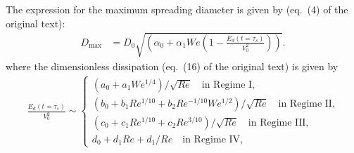 \documentclass[reprint,amssymb,superscriptaddress,aps,prfluids,onecolumn]{revtex4-1}
\begin{document}
The expression for the maximum spreading diameter is given by (eq.~(4) of the original text):
\begin{align}
	\label{suppleq:GlobalDmax_v2}
	D_{\text{max}} &= D_0\sqrt{\left(\alpha_0 + \alpha_1We\left(1 - \frac{E_d(t = \tau_s)}{V_0^2}\right)\right)}. 
\end{align}
where the dimensionless dissipation (eq.~(16) of the original text) is given by
\begin{align}
	\label{suppleq:FinalDmax}
	\frac{E_d(t = \tau_s)}{V_0^2} \sim \begin{cases}
		\left(a_0 + a_1We^{1/4}\right)/\sqrt{Re}\quad\text{in Regime I,}\\
		\left(b_0 + b_1Re^{1/10} + b_2Re^{-1/10}We^{1/2} \right)/\sqrt{Re}\quad\text{in Regime II,}\\
		\left(c_0 + c_1Re^{1/10} + c_2Re^{3/10}\right)/\sqrt{Re}\quad\text{in Regime III,}\\
		d_0 + d_1Re + d_1/Re\quad\text{in Regime IV,}
	\end{cases}
\end{align}
\end{document}
